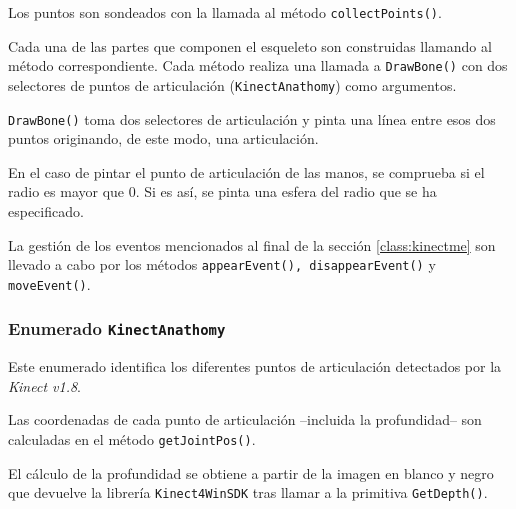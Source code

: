 \documentclass[10pt,a4paper]{report}
\begin{document}
	
	
	Los puntos son sondeados con la llamada al método \texttt{collectPoints()}.
	
	
	
	Cada una de las partes que componen el esqueleto son construidas llamando al método correspondiente. Cada método realiza una llamada a \texttt{DrawBone()} con dos selectores de puntos de articulación (\texttt{KinectAnathomy}) como argumentos.
	
	
	
	\texttt{DrawBone()} toma dos selectores de articulación y pinta una línea entre esos dos puntos originando, de este modo, una articulación. 
	
	En el caso de pintar el punto de articulación de las manos, se comprueba si el radio es mayor que 0. Si es así, se pinta una esfera del radio que se ha especificado. 
	
	
	
	La gestión de los eventos mencionados al final de la sección \ref{class:kinectme} son llevado a cabo por los métodos \texttt{appearEvent(), disappearEvent()} y \texttt{moveEvent()}.
	
	
	
	
	\subsubsection{Enumerado \texttt{KinectAnathomy}}
	Este enumerado identifica los diferentes puntos de articulación detectados por la \textit{Kinect v1.8}.
	
	
	
	Las coordenadas de cada punto de articulación --incluida la profundidad-- son calculadas en el método \texttt{getJointPos()}.
	
	
	
	El cálculo de la profundidad se obtiene a partir de la imagen en blanco y negro que devuelve la librería \texttt{Kinect4WinSDK} tras llamar a la primitiva \texttt{GetDepth()}.
	
\end{document}
